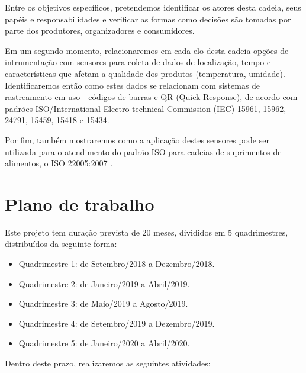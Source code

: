 \documentclass[
	12pt,				%
	openright,			%
	oneside,			%
	a4paper,			%
	english,			%
	french,				%
	spanish,			%
	brazil,				%
	]{abntex2}
\begin{document}
Entre os objetivos específicos, pretendemos identificar os atores desta cadeia, seus papéis e responsabilidades e verificar as formas como decisões são tomadas por parte dos produtores, organizadores e consumidores.

Em um segundo momento, relacionaremos em cada elo desta cadeia   opções de intrumentação com sensores para coleta de dados de localização, tempo e características que afetam a qualidade dos produtos (temperatura, umidade). Identificaremos então como estes dados se relacionam com sistemas de rastreamento em uso - códigos de barras e QR (Quick Response), de acordo com padrões ISO/International Electro-technical Commission (IEC) 15961, 15962, 24791, 15459, 15418 e 15434.

Por fim, também mostraremos como a aplicação destes sensores pode ser utilizada para o atendimento do padrão ISO para cadeias de suprimentos de alimentos, o ISO 22005:2007 .


\chapter{Plano de trabalho}

Este projeto tem duração prevista de 20 meses, divididos em 5 quadrimestres, distribuídos da seguinte forma:

\begin{itemize}
\item Quadrimestre 1: de Setembro/2018 a Dezembro/2018.
\item Quadrimestre 2: de Janeiro/2019 a Abril/2019.
\item Quadrimestre 3: de Maio/2019 a Agosto/2019.
\item Quadrimestre 4: de Setembro/2019 a Dezembro/2019.
\item Quadrimestre 5: de Janeiro/2020 a Abril/2020.
\end{itemize}
Dentro deste prazo, realizaremos as seguintes atividades:
\end{document}
